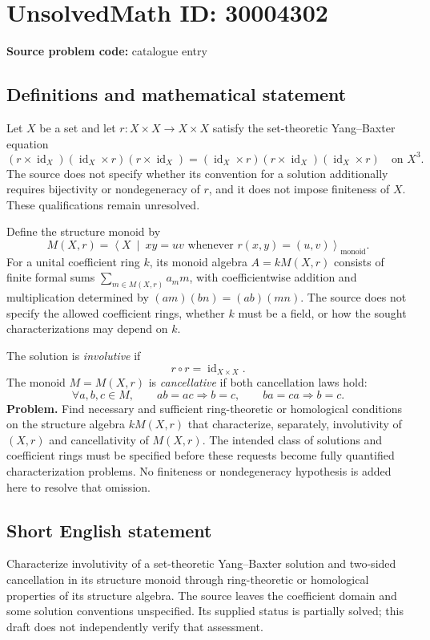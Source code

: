 \documentclass[11pt]{article}
\begin{document}
\section*{UnsolvedMath ID: 30004302}
\textbf{Source problem code:} catalogue entry
\subsection{Definitions and mathematical statement}
Let \(X\) be a set and let \(r:X\times X\to X\times X\) satisfy the set-theoretic Yang--Baxter equation
\[
(r\times\operatorname{id}_X)(\operatorname{id}_X\times r)(r\times\operatorname{id}_X)
=
(\operatorname{id}_X\times r)(r\times\operatorname{id}_X)(\operatorname{id}_X\times r)
\quad\text{on }X^3.
\]
The source does not specify whether its convention for a solution additionally requires bijectivity or nondegeneracy of \(r\), and it does not impose finiteness of \(X\). These qualifications remain unresolved.

Define the structure monoid by
\[
M(X,r)=\left\langle X\ \middle|\ xy=uv\text{ whenever }r(x,y)=(u,v)\right\rangle_{\mathrm{monoid}}.
\]
For a unital coefficient ring \(k\), its monoid algebra \(A=kM(X,r)\) consists of finite formal sums \(\sum_{m\in M(X,r)}a_m m\), with coefficientwise addition and multiplication determined by \((a m)(b n)=(ab)(mn)\). The source does not specify the allowed coefficient rings, whether \(k\) must be a field, or how the sought characterizations may depend on \(k\).

The solution is \emph{involutive} if
\[
r\circ r=\operatorname{id}_{X\times X}.
\]
The monoid \(M=M(X,r)\) is \emph{cancellative} if both cancellation laws hold:
\[
\forall a,b,c\in M,\qquad
ab=ac\Longrightarrow b=c,
\qquad
ba=ca\Longrightarrow b=c.
\]
\textbf{Problem.} Find necessary and sufficient ring-theoretic or homological conditions on the structure algebra \(kM(X,r)\) that characterize, separately, involutivity of \((X,r)\) and cancellativity of \(M(X,r)\). The intended class of solutions and coefficient rings must be specified before these requests become fully quantified characterization problems. No finiteness or nondegeneracy hypothesis is added here to resolve that omission.
\subsection{Short English statement}
Characterize involutivity of a set-theoretic Yang--Baxter solution and two-sided cancellation in its structure monoid through ring-theoretic or homological properties of its structure algebra. The source leaves the coefficient domain and some solution conventions unspecified. Its supplied status is partially solved; this draft does not independently verify that assessment.
\end{document}

